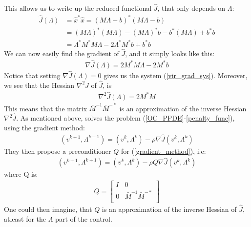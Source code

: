 \documentclass[11pt,a4paper]{article}
\begin{document}
This allows us to write up the reduced functional $\hat{J}$, that only depends on $\Lambda$:
\begin{align*}
\hat{J}(\Lambda)&= \hat{x}^*\hat{x} =
(M  \Lambda -b)^*(M  \Lambda -b) \\
&= (M  \Lambda)^*(M  \Lambda) - (M  \Lambda)^*b-b^*(M  \Lambda) + b^*b \\
&=\Lambda^*M^*M  \Lambda - 2\Lambda^*M^*b + b^*b
\end{align*}
We can now easily find the gradient of $\hat{J}$, and it simply looks like this:
\begin{align*}
\nabla\hat{J}(\Lambda) = 2 M^*M\Lambda - 2M^*b
\end{align*}
Notice that setting $\nabla\hat{J}(\Lambda)=0$ gives us the system (\ref{vir_grad_sys}). Moreover, we see that the Hessian $\nabla^2 \hat{J}$ of $\hat{J}$, is
\begin{align}
\nabla^2 \hat{J}(\Lambda) = 2 M^*M
\end{align}
This means that the matrix $\bar{M}^{-1}\bar{M}^{-*}$ is an approximation of the inverse Hessian $\nabla^2 \hat{J}$. As mentioned above, \cite{maday2002parareal} solves the problem (\ref{OC_PPDE}-\ref{penalty_func}), using the gradient method:
\begin{align}
(v^{k+1},\Lambda^{k+1}) = (v^{k},\Lambda^{k}) -\rho\nabla\hat{J}(v^{k},\Lambda^{k}) \label{gradient_method}
\end{align}
They then propose a preconditioner $Q$ for (\ref{gradient_method}), i.e:
\begin{align}
(v^{k+1},\Lambda^{k+1}) = (v^{k},\Lambda^{k}) -\rho Q\nabla\hat{J}(v^{k},\Lambda^{k}) 
\end{align}
where Q is:
\begin{align}
Q = \left[ \begin{array}{cc}
	I & 0 \\
	0 & \bar{M}^{-1}\bar{M}^{-*} \\
	\end{array} \right] \label{PC}
\end{align}
One could then imagine, that $Q$ is an approximation of the inverse Hessian of $\hat{J}$, atleast for the $\Lambda$ part of the control.
\end{document}
